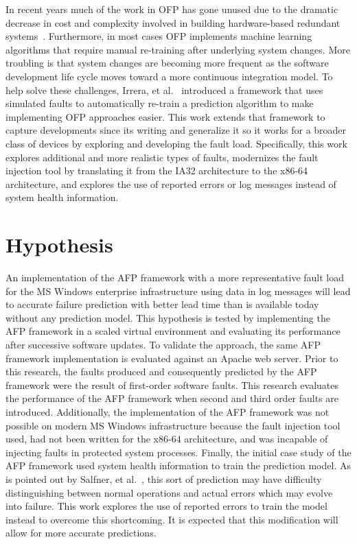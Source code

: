 In recent years much of the work in \ac{OFP} has gone unused due to the
dramatic decrease in cost and complexity involved in building hardware-based
redundant systems~\cite{irrera2015}.  Furthermore, in most cases \ac{OFP}
implements machine learning algorithms that require manual re-training after
underlying system changes.  More troubling is that system changes are becoming
more frequent as the software development life cycle moves toward a more
continuous integration model.  To help solve these challenges, Irrera, et
al.~\cite{irrera2015} introduced a framework that uses simulated faults to
automatically re-train a prediction algorithm to make implementing \ac{OFP}
approaches easier.  This work extends that framework to capture developments
since its writing and generalize it so it works for a broader class of devices
by exploring and developing the fault load.  Specifically, this work explores
additional and more realistic types of faults, modernizes the fault
injection tool by translating it from the IA32 architecture to the x86-64
architecture, and explores the use of reported errors or log messages instead
of system health information.

\section{Hypothesis}
An implementation of the \ac{AFP} framework with a more representative fault
load for the \ac{MS} Windows enterprise infrastructure using data in log
messages will lead to accurate failure prediction with better lead time than is
available today without any prediction model.  This hypothesis is tested by
implementing the \ac{AFP} framework in a scaled virtual environment and
evaluating its performance after successive software updates.  To validate the
approach, the same \ac{AFP} framework implementation is evaluated against an
Apache web server.  Prior to this research, the faults produced and
consequently predicted by the \ac{AFP} framework were the result of first-order
software faults.  This research evaluates the performance of the \ac{AFP}
framework when second and third order faults are introduced.  Additionally, the
implementation of the \ac{AFP} framework was not possible on modern \ac{MS}
Windows infrastructure because the fault injection tool used, had not been
written for the x86-64 architecture, and was incapable of injecting faults in
protected system processes.  Finally, the initial case study of the \ac{AFP}
framework used system health information to train the prediction model.  As is
pointed out by Salfner, et al.~\cite{salfnerSurvey}, this sort of prediction
may have difficulty distinguishing between normal operations and actual errors
which may evolve into failure.  This work explores the use of reported errors
to train the model instead to overcome this shortcoming.  It is expected that
this modification will allow for more accurate predictions.

